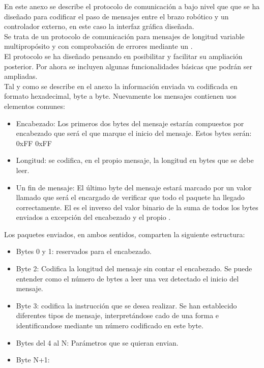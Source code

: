 
En este anexo se describe el protocolo de comunicación a bajo nivel que que se ha diseñado para codificar el paso de mensajes entre el brazo robótico y un controlador externo, en este caso la interfaz gráfica diseñada.
\\


Se trata de un protocolo de comunicación para mensajes de longitud variable multipropósito y con comprobación de errores mediante un .
\\


El protocolo se ha diseñado pensando en posibilitar y facilitar su ampliación posterior. Por ahora se incluyen algunas funcionalidades básicas que podrán ser ampliadas.
\\


Tal y como se describe en el anexo \cite{app:registros_g15} la información enviada va codificada en formato hexadecimal, byte a byte. Nuevamente los mensajes contienen uos elementos comunes:


\begin{itemize}

\item Encabezado: Los primeros dos bytes del mensaje estarán compuestos por encabezado que será el que marque el inicio del mensaje. Estos bytes serán: 0xFF 0xFF

\item Longitud: se codifica, en el propio mensaje, la longitud en bytes que se debe leer.

\item Un fin de mensaje: El último byte del mensaje estará marcado por un valor llamado  que será el encargado de verificar que todo el paquete ha llegado correctamente. El  es el inverso del valor binario de la suma de todos los bytes enviados a excepción del encabezado y el propio .

\end{itemize}


Los paquetes enviados, en ambos sentidos, comparten la siguiente estructura:


\begin{itemize}

\item Bytes 0 y 1: reservados para el encabezado.

\item Byte 2: Codifica la longitud del mensaje sin contar el encabezado. Se puede entender como el número de bytes a leer una vez detectado el inicio del mensaje.

\item Byte 3: codifica la instrucción que se desea realizar. Se han establecido diferentes tipos de mensaje, interpretándose cado de una forma e identificandose mediante un número codificado en este byte.

\item Bytes del 4 al N: Parámetros que se quieran envian.

\item Byte N+1: 

\end{itemize}


